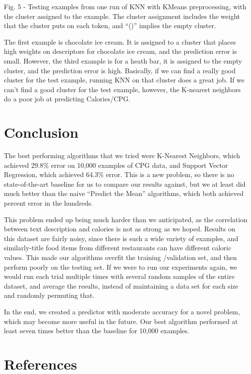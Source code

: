 \documentclass{article}
\begin{document}
Fig. 5 - Testing examples from one run of KNN with KMeans preprocessing, with the cluster assigned to the example. The cluster assignment includes the weight that the cluster puts on each token, and “()” implies the empty cluster.

The first example is chocolate ice cream. It is assigned to a cluster that places high weights on descriptors for chocolate ice cream, and the prediction error is small. However, the third example is for a heath bar, it is assigned to the empty cluster, and the prediction error is high. Basically, if we can find a really good cluster for the test example, running KNN on that cluster does a great job. If we can’t find a good cluster for the test example, however, the K-nearest neighbors do a poor job at predicting Calories/CPG.

\section{Conclusion}
The best performing algorithms that we tried were K-Nearest Neighbors, which achieved 29.8\% error on 10,000 examples of CPG data, and Support Vector Regression, which achieved 64.3\% error. This is a new problem, so there is no state-of-the-art baseline for us to compare our results against, but we at least did much better than the naive “Predict the Mean” algorithms, which both achieved percent error in the hundreds.

This problem ended up being much harder than we anticipated, as the correlation between text description and calories is not as strong as we hoped. Results on this dataset are fairly noisy, since there is such a wide variety of examples, and similarly-title food items from different restaurants can have different caloric values. This made our algorithms overfit the training /validation set, and then perform poorly on the testing set. If we were to run our experiments again, we would run each trial multiple times with several random samples of the entire dataset, and average the results, instead of maintaining a data set for each size and randomly permuting that.

In the end, we created a predictor with moderate accuracy for a novel problem, which may become more useful in the future. Our best algorithm performed at least seven times better than the baseline for 10,000 examples.

\section{References}
\end{document}

